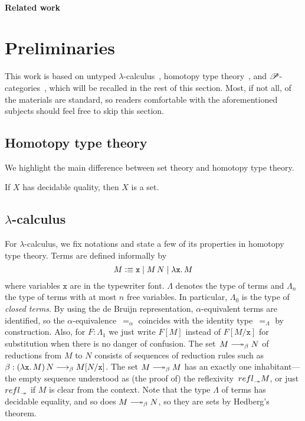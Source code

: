 \documentclass[a4paper,UKenglish,numberwithinsect,cleveref,thm-restate]{lipics-v2021}
\numberwithin{equation}{section}
\theoremstyle{plain}
\begin{document}
\paragraph*{Related work}
\cite{Visser2019,Beklemishev2006}
\cite{Kavvos2020}
\cite{Shamkanov2014,Shamkanov2016a}

\section{Preliminaries}\label{sec:preliminaries}
This work is based on untyped $\lambda$-calculus~\cite{Barendregt1984a}, homotopy type theory~\cite{hottbook}, and $\mathscr{P}$-categories~\cite{Cubric1998a}, which will be recalled in the rest of this section.
Most, if not all, of the materials are standard, so readers comfortable with the aforementioned subjects should feel free to skip this section.

\subsection{Homotopy type theory}
We highlight the main difference between set theory and homotopy type theory.
\begin{theorem}[Hedberg]
  If $X$ has decidable quality, then $X$ is a set.
\end{theorem}

\subsection{\texorpdfstring{$\lambda$}{λ}-calculus}
For $\lambda$-calculus, we fix notations and state a few of its properties in homotopy type theory.
Terms are defined informally by
\[
  M \vcentcolon\equiv \mathtt{x} \mid M\,N \mid \lambda \mathtt{x}.\, M
\]
where variables $\mathtt{x}$ are in the typewriter font.
$\Lambda$ denotes the type of terms and $\Lambda_n$ the type of terms with at most $n$ free variables.
In particular, $\Lambda_0$ is the type of \emph{closed terms}.
By using the de Bruijn representation, $\alpha$-equivalent terms are identified, so the $\alpha$-equivalence~$=_\alpha$ coincides with the identity type~$=_\Lambda$ by construction.
Also, for $F : \Lambda_1$ we just write $F[M]$ instead of $F[M/\mathtt{x}]$ for substitution when there is no danger of confusion.
The set~$M \reduce N$ of reductions from $M$ to $N$ consists of sequences of reduction rules such as $\beta : (\lambda \mathtt{x}.\,M)\,N \longrightarrow_{\beta} M [ N / \mathtt{x} ]$.
The set $M \reduce M$ has an exactly one inhabitant---the empty sequence understood as (the proof of) the reflexivity~$\refl_\twoheadrightarrow M$, or just $\refl_\twoheadrightarrow$ if $M$ is clear from the context.
Note that the type $\Lambda$ of terms has decidable equality, and so does $M \reduce N$, so they are sets by Hedberg's theorem.
\end{document}

